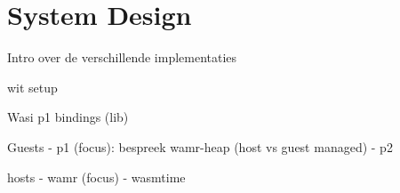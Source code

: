\chapter{System Design }
\label{chap:3}


Intro over de verschillende implementaties

wit setup

Wasi p1 bindings (lib)

Guests
- p1 (focus): bespreek wamr-heap (host vs guest managed)
- p2

hosts
- wamr (focus)
- wasmtime

